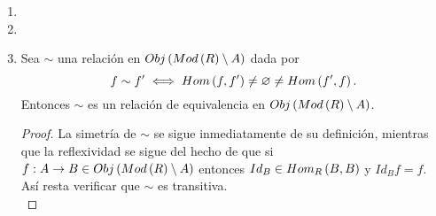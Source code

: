 \documentclass{article}
\begin{document}
\begin{enumerate}[label=\textbf{Ej \arabic*.}]
\begin{proof}
		\begin{align*}
			rz+w&=r\lrprth{f\lrprth{a_z}+j_z}+f\lrprth{a_w}+j_w\\
			&=f\lrprth{ra_z+a_w}+rj_z+j_w.
		\end{align*}
		Aplicando el hecho de que $J$ es un submódulo de $M$ y $\lrprth{\ref{unicidadsdf}}$ a lo anterior se sigue que 
		\begin{align*}
			\varphi\lrprth{rz+w}&=ra_z+a_w\\
			&=rf(z)+f(w).
		\intertext{Finalmente notemos que, si $a\in M_1$, $\varphi f\lrprth{a}=\varphi\lrprth{f\lrprth{a}+0}=a$, así que $\varphi f=Id_{M_1}$}
		\therefore &\ f\text{ es un split-mono.} 
		\end{align*}
		Por otro lado, como $N=N'$, se tiene que $M=N'\oplus J$ y así
		\begin{align*}
			Ker\lrprth{\restrict{g}{J}}&=Ker\lrprth{g}\cap J\\
			&=N'\cap J=\genmod{0}{R},\\
			\intertext{y como $g$ es sobre}
			M_2&=g\lrprth{M}\\
			&=g\lrprth{\lrbrack{g(a+b)\ \vline\ a\in Ker\lrprth{g}, b\in J}}\\
			&=g\lrprth{\lrbrack{g(b)\ \vline\ b\in J}}\\
			&=g\lrprth{J}\\
			&=\restrict{g}{J}(J),\\
			&\implies \restrict{g}{J}:J\to M_2 \text{ es un isomorfismo.}
		\end{align*}
		Por lo anterior $\exists\ h\in\ringmodhom{R}{M_2}{J}$ tal que $h\restrict{g}{J}=Id_J$ y $\restrict{g}{J}h=Id_{M_2}$, con lo cual $Im\lrprth{h}=J$. Así $gh=\restrict{g}{J}h$ y por lo tanto $g$ es un split-epi.\\
 		\end{proof}
		\item 
		\item
		\item Sea $\sim$ una relación en $Obj\left(Mod\left(R\right)\setminus A\right)$ dada por
		\begin{equation*}
			f\sim f'\iff Hom\left(f,f'\right)\neq\varnothing\neq Hom\left(f',f\right).
		\end{equation*}
		Entonces $\sim$ es un relación de equivalencia en $Obj\left(Mod\left(R\right)\setminus A\right)$.
		\begin{proof}
			La simetría de $\sim$ se sigue inmediatamente de su definición, mientras que la reflexividad se sigue del hecho de que si $f:A\to B\in Obj\left(Mod\left(R\right)\setminus A\right)$ entonces $Id_B\in Hom_{R}\left(B,B\right)$ y $Id_B f=f$. Así resta verificar que $\sim$ es transitiva.\\

\end{proof}
\end{enumerate}
\end{document}
